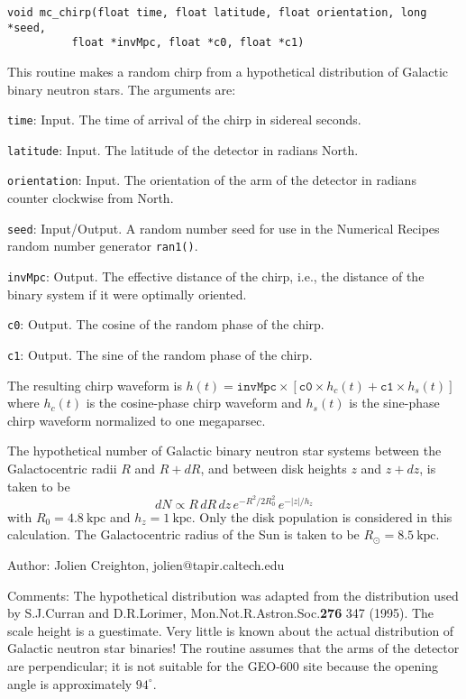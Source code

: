 \begin{verbatim}
void mc_chirp(float time, float latitude, float orientation, long *seed,
	      float *invMpc, float *c0, float *c1)
\end{verbatim}

This routine makes a random chirp from a hypothetical distribution of Galactic
binary neutron stars.  The arguments are:
\begin{description}
\item{\texttt{time}}: Input.  The time of arrival of the chirp in sidereal
  seconds.
\item{\texttt{latitude}}: Input.  The latitude of the detector in radians
  North.
\item{\texttt{orientation}}: Input.  The orientation of the arm of the detector
  in radians counter clockwise from North.
\item{\texttt{seed}}: Input/Output.  A random number seed for use in the
  Numerical Recipes random number generator \texttt{ran1()}.
\item{\texttt{invMpc}}: Output.  The effective distance of the chirp, i.e.,
  the distance of the binary system if it were optimally oriented.
\item{\texttt{c0}}: Output.  The cosine of the random phase of the chirp.
\item{\texttt{c1}}: Output.  The sine of the random phase of the chirp.
\end{description}
The resulting chirp waveform is
$h(t)=\texttt{invMpc}\times[\texttt{c0}\times h_c(t)+\texttt{c1}\times h_s(t)]$
where $h_c(t)$ is the cosine-phase chirp waveform and $h_s(t)$ is the
sine-phase chirp waveform normalized to one megaparsec.

The hypothetical number of Galactic binary neutron star systems between the
Galactocentric radii $R$ and $R+dR$, and between disk heights $z$ and $z+dz$,
is taken to be
\begin{equation}
  dN \propto R\,dR\,dz\,e^{-R^2/2R_0^2}\,e^{-|z|/h_z}
\end{equation}
with $R_0=4.8\:\mbox{kpc}$ and $h_z=1\:\mbox{kpc}$.  Only the disk population
is considered in this calculation.  The Galactocentric radius of the Sun
is taken to be $R_\odot=8.5\:\mbox{kpc}$.

\begin{description}
\item{Author:} Jolien Creighton, jolien@tapir.caltech.edu
\item{Comments:} The hypothetical distribution was adapted from the
  distribution used by S.\@ J.\@ Curran and D.\@ R.\@ Lorimer,
  Mon.\@ Not.\@ R.\@ Astron.\@ Soc.\@ \textbf{276} 347 (1995).  The scale
  height is a guestimate.  Very little is known about the actual distribution
  of Galactic neutron star binaries!  The routine assumes that the arms of the
  detector are perpendicular; it is not suitable for the
  GEO-600 site because the opening angle is approximately $94^\circ$.
\end{description}
\clearpage


